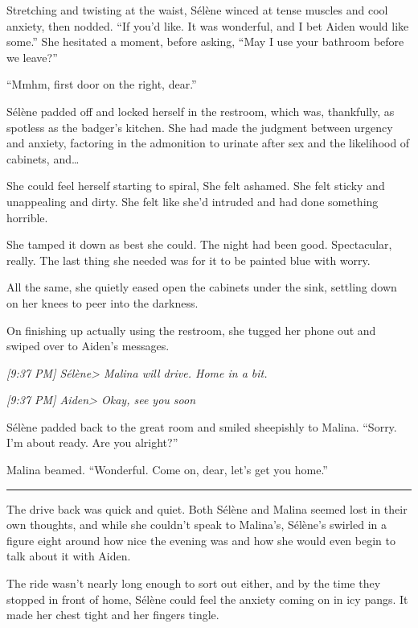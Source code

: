 Stretching and twisting at the waist, Sélène winced at tense muscles and cool anxiety, then nodded. ``If you'd like. It was wonderful, and I bet Aiden would like some.'' She hesitated a moment, before asking, ``May I use your bathroom before we leave?''

``Mmhm, first door on the right, dear.''

Sélène padded off and locked herself in the restroom, which was, thankfully, as spotless as the badger's kitchen. She had made the judgment between urgency and anxiety, factoring in the admonition to urinate after sex and the likelihood of cabinets, and\ldots{}

She could feel herself starting to spiral, She felt ashamed. She felt sticky and unappealing and dirty. She felt like she'd intruded and had done something horrible.

She tamped it down as best she could. The night had been good. Spectacular, really. The last thing she needed was for it to be painted blue with worry.

All the same, she quietly eased open the cabinets under the sink, settling down on her knees to peer into the darkness.

On finishing up actually using the restroom, she tugged her phone out and swiped over to Aiden's messages.

\emph{{[}9:37 PM{]} Sélène\textgreater{} Malina will drive. Home in a bit.}

\emph{{[}9:37 PM{]} Aiden\textgreater{} Okay, see you soon}

Sélène padded back to the great room and smiled sheepishly to Malina. ``Sorry. I'm about ready. Are you alright?''

Malina beamed. ``Wonderful. Come on, dear, let's get you home.''

\begin{center}\rule{0.5\linewidth}{\linethickness}\end{center}

The drive back was quick and quiet. Both Sélène and Malina seemed lost in their own thoughts, and while she couldn't speak to Malina's, Sélène's swirled in a figure eight around how nice the evening was and how she would even begin to talk about it with Aiden.

The ride wasn't nearly long enough to sort out either, and by the time they stopped in front of home, Sélène could feel the anxiety coming on in icy pangs. It made her chest tight and her fingers tingle.

